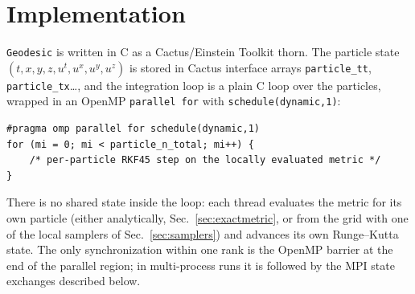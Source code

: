 \documentclass[11pt]{article}
\begin{document}
\section{Implementation}\label{sec:impl}

\texttt{Geodesic} is written in C as a Cactus/Einstein Toolkit thorn.
The particle state
$(t,x,y,z,u^t,u^x,u^y,u^z)$ is stored in Cactus interface arrays
\texttt{particle\_tt}, \texttt{particle\_tx}\ldots, and the integration loop
is a plain C loop over the particles, wrapped in an OpenMP
\texttt{parallel for} with \texttt{schedule(dynamic,1)}:
\begin{verbatim}
#pragma omp parallel for schedule(dynamic,1)
for (mi = 0; mi < particle_n_total; mi++) {
    /* per-particle RKF45 step on the locally evaluated metric */
}
\end{verbatim}
There is no shared state inside the loop: each thread evaluates the metric
for its own particle (either analytically, Sec.~\ref{sec:exactmetric}, or
from the grid with one of the local samplers of Sec.~\ref{sec:samplers})
and advances its own Runge--Kutta state.  The only synchronization within
one rank is the OpenMP barrier at the
end of the parallel region; in multi-process runs it is followed by the
MPI state exchanges described below.
\end{document}
